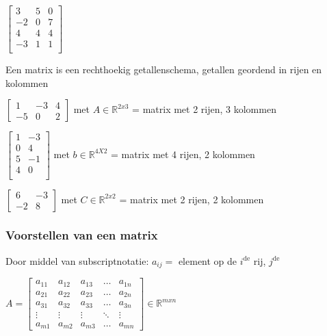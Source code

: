 \documentclass{article}
\begin{document}
\begin{center}
    $\begin{bmatrix}
        3 & 5 & 0\\
        -2 & 0 & 7\\
        4 & 4 & 4\\
        -3 & 1 & 1\\
    \end{bmatrix}$
\end{center}


Een matrix is een rechthoekig getallenschema, getallen geordend in rijen en kolommen

\begin{center}
    $\begin{bmatrix}
        1 & -3 & 4\\
        -5 & 0 & 2
    \end{bmatrix}$ met $A \in \mathbb{R}^{2x3}$ = matrix met 2 rijen, 3 kolommen        
\end{center}

\begin{center}
    $\begin{bmatrix}
        1 & -3\\
        0 & 4\\
        5 & -1\\
        4 & 0\\
    \end{bmatrix}$ met $b \in \mathbb{R}^{4X2}$ = matrix met 4 rijen, 2 kolommen
\end{center}

\begin{center}
    $\begin{bmatrix}
        6 & -3\\
        -2 & 8
    \end{bmatrix}$ met $C \in \mathbb{R}^{2x2}$ = matrix met 2 rijen, 2 kolommen        
\end{center}

\subsubsection{Voorstellen van een matrix}

Door middel van subscriptnotatie: $a_{ij} =$ element op de $i^\text{de}$ rij, $j^\text{de}$

\begin{center}
    $A = \begin{bmatrix}
        a_{11} & a_{12} & a_{13} & \dots & a_{1n}\\
        a_{21} & a_{22} & a_{23} & \dots & a_{2n}\\
        a_{31} & a_{32} & a_{33} & \dots & a_{3n}\\
        \vdots & \vdots & \vdots & \ddots & \vdots\\
        a_{m1} & a_{m2} & a_{m3} & \dots & a_{mn}
    \end{bmatrix} \in \mathbb{R}^{mxn}$
\end{center}
\end{document}
